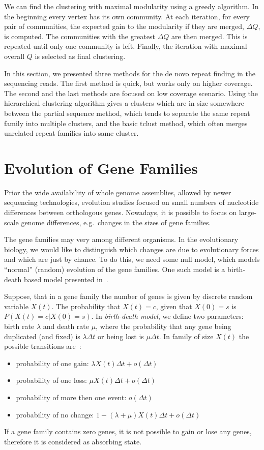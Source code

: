 We can find the clustering with maximal modularity using a greedy algorithm. In the beginning every vertex has its own community.
At each iteration, for every pair of communities, the expected gain to the modularity if they are merged, $\Delta Q$, is computed. The communities with the greatest $\Delta Q$ are then merged. This is repeated until only one community is left. Finally, the iteration with maximal overall $Q$ is selected as final clustering.

In this section, we presented three methods for the de novo repeat finding in the sequencing reads. The first method is quick, but works only on higher coverage. The second and the last methods are focused on low coverage scenario. Using the hierarchical clustering algorithm gives a clusters which are in size somewhere between the partial sequence method, which tends to separate the same repeat family into multiple clusters, and the basic tclust method, which often merges unrelated repeat families into same cluster.

\section{Evolution of Gene Families}

Prior the wide availability of whole genome assemblies, allowed by newer sequencing technologies, evolution studies focused on small numbers of nucleotide differences between orthologous genes. Nowadays, it is possible to focus on large-scale genome differences, e.g.\ changes in the sizes of gene families.

The gene families may very among different organisms. In the evolutionary biology, we would like to distinguish which changes are due to evolutionary forces and which are just by chance. To do this, we need some null model, which models ``normal'' (random) evolution of the gene families. One such model is a birth-death based model presented in~\cite{hahn2005estimating}.

Suppose, that in a gene family the number of genes is given by discrete random variable $X(t)$. The probability that $X(t) = c$, given that $X(0) = s$ is $P(X(t) = c | X(0) = s)$.
In \emph{birth-death model}, we define two parameters: birth rate $\lambda$ and death rate $\mu$, where the probability that any gene being duplicated (and fixed) is $\lambda \Delta t$ or being lost is $\mu \Delta t$. In family of size $X(t)$ the possible transitions are~\cite{hahn2005estimating}:
\begin{itemize}
  \item probability of one gain: $\lambda X(t) \Delta t + o(\Delta t)$
  \item probability of one loss: $\mu X(t) \Delta t + o(\Delta t)$
  \item probability of more then one event: $o(\Delta t)$
  \item probability of no change: $1 - (\lambda + \mu) X(t) \Delta t + o(\Delta t)$
\end{itemize}
If a gene family contains zero genes, it is not possible to gain or lose any genes, therefore it is considered as absorbing state.

